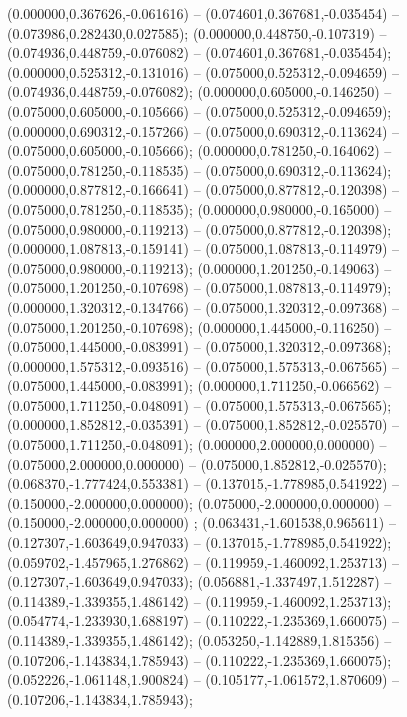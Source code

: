  (0.000000,0.367626,-0.061616) -- (0.074601,0.367681,-0.035454) -- (0.073986,0.282430,0.027585);
 (0.000000,0.448750,-0.107319) -- (0.074936,0.448759,-0.076082) -- (0.074601,0.367681,-0.035454);
 (0.000000,0.525312,-0.131016) -- (0.075000,0.525312,-0.094659) -- (0.074936,0.448759,-0.076082);
 (0.000000,0.605000,-0.146250) -- (0.075000,0.605000,-0.105666) -- (0.075000,0.525312,-0.094659);
 (0.000000,0.690312,-0.157266) -- (0.075000,0.690312,-0.113624) -- (0.075000,0.605000,-0.105666);
 (0.000000,0.781250,-0.164062) -- (0.075000,0.781250,-0.118535) -- (0.075000,0.690312,-0.113624);
 (0.000000,0.877812,-0.166641) -- (0.075000,0.877812,-0.120398) -- (0.075000,0.781250,-0.118535);
 (0.000000,0.980000,-0.165000) -- (0.075000,0.980000,-0.119213) -- (0.075000,0.877812,-0.120398);
 (0.000000,1.087813,-0.159141) -- (0.075000,1.087813,-0.114979) -- (0.075000,0.980000,-0.119213);
 (0.000000,1.201250,-0.149063) -- (0.075000,1.201250,-0.107698) -- (0.075000,1.087813,-0.114979);
 (0.000000,1.320312,-0.134766) -- (0.075000,1.320312,-0.097368) -- (0.075000,1.201250,-0.107698);
 (0.000000,1.445000,-0.116250) -- (0.075000,1.445000,-0.083991) -- (0.075000,1.320312,-0.097368);
 (0.000000,1.575312,-0.093516) -- (0.075000,1.575313,-0.067565) -- (0.075000,1.445000,-0.083991);
 (0.000000,1.711250,-0.066562) -- (0.075000,1.711250,-0.048091) -- (0.075000,1.575313,-0.067565);
 (0.000000,1.852812,-0.035391) -- (0.075000,1.852812,-0.025570) -- (0.075000,1.711250,-0.048091);
 (0.000000,2.000000,0.000000) -- (0.075000,2.000000,0.000000) -- (0.075000,1.852812,-0.025570);
 (0.068370,-1.777424,0.553381) -- (0.137015,-1.778985,0.541922) -- (0.150000,-2.000000,0.000000);
 (0.075000,-2.000000,0.000000) -- (0.150000,-2.000000,0.000000) ;
 (0.063431,-1.601538,0.965611) -- (0.127307,-1.603649,0.947033) -- (0.137015,-1.778985,0.541922);
 (0.059702,-1.457965,1.276862) -- (0.119959,-1.460092,1.253713) -- (0.127307,-1.603649,0.947033);
 (0.056881,-1.337497,1.512287) -- (0.114389,-1.339355,1.486142) -- (0.119959,-1.460092,1.253713);
 (0.054774,-1.233930,1.688197) -- (0.110222,-1.235369,1.660075) -- (0.114389,-1.339355,1.486142);
 (0.053250,-1.142889,1.815356) -- (0.107206,-1.143834,1.785943) -- (0.110222,-1.235369,1.660075);
 (0.052226,-1.061148,1.900824) -- (0.105177,-1.061572,1.870609) -- (0.107206,-1.143834,1.785943);
